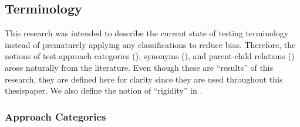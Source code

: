 \ifnotpaper\else\ieeeTestTermsTable{}\fi

\subsection{Terminology}

This research was intended to describe the current state of testing
terminology instead of prematurely applying any classifications to reduce bias.
Therefore, the notions of test approach categories (),
synonyms (), and parent-child relations ()
arose naturally from the literature. Even though these are ``results'' of this
research, they are defined here for clarity since they are used throughout this
\ifnotpaper thesis\else paper\fi. We also define the notion of ``rigidity'' in
.

\subsubsection{Approach Categories}
\label{categories-observ}

